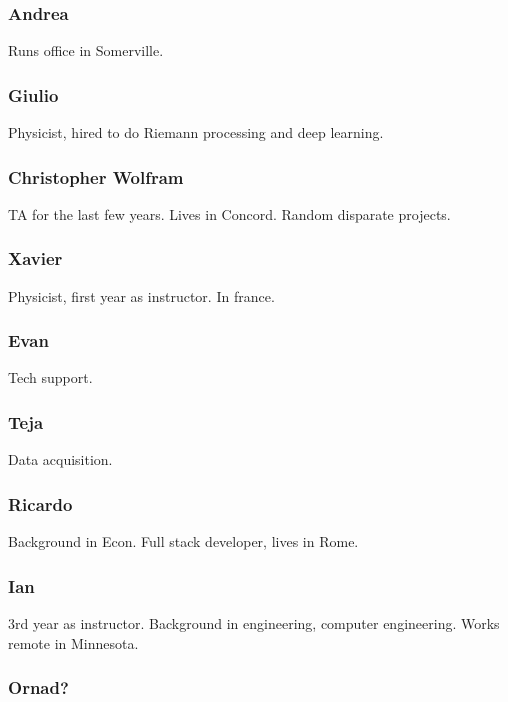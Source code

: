 \documentclass[11pt]{article}
\theoremstyle{definition}
\begin{document}
\subsubsection{Andrea}

Runs office in Somerville. 

\subsubsection{Giulio}

Physicist, hired to do Riemann processing and deep learning. 

\subsubsection{Christopher Wolfram}

TA for the last few years. Lives in Concord. Random disparate projects. 

\subsubsection{Xavier}

Physicist, first year as instructor. In france.

\subsubsection{Evan}

Tech support. 

\subsubsection{Teja}

Data acquisition.

\subsubsection{Ricardo}

Background in Econ. Full stack developer, lives in Rome. 

\subsubsection{Ian}

3rd year as instructor. Background in engineering, computer engineering. Works remote in Minnesota.

\subsubsection{Ornad?}
\end{document}
